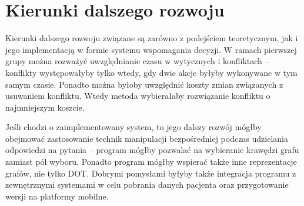 \section{Kierunki dalszego rozwoju}


Kierunki dalszego rozwoju związane są zarówno z podejściem teoretycznym, jak i jego implementacją w formie systemu wspomagania decyzji. W ramach pierwszej grupy można rozważyć uwzględnianie czasu w wytycznych i konfliktach -- konflikty występowałyby tylko wtedy, gdy dwie akcje byłyby wykonywane w tym samym czasie. Ponadto można byłoby uwzględnić koszty zmian związanych z usuwaniem konfliktu. Wtedy metoda wybierałaby rozwiązanie konfliktu o najmniejszym koszcie. 

Jeśli chodzi o zaimplementowany system, to jego dalszy rozwój mógłby obejmować zastosowanie technik manipulacji bezpośredniej podczas udzielania odpowiedzi na pytania -- program mógłby pozwalać na wybieranie krawędzi grafu zamiast pól wyboru. Ponadto program mógłby wspierać także inne reprezentacje grafów, nie tylko DOT. Dobrymi pomysłami byłyby także integracja programu z zewnętrznymi systemami w celu pobrania danych pacjenta oraz przygotowanie wersji na platformy mobilne.


